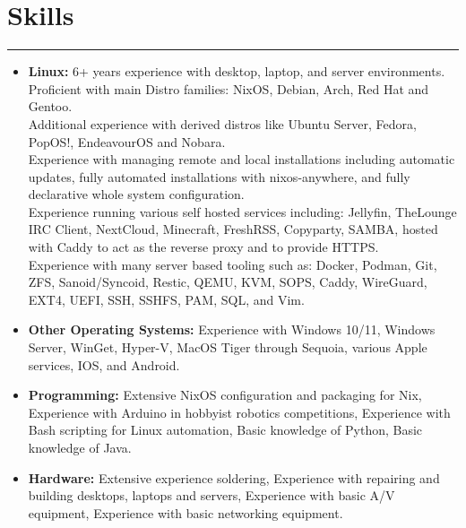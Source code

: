 \documentclass[a4paper,11pt]{article}
\begin{document}
\section*{\hspace*{1em} Skills}
\vspace{-0.2cm}
\hrule
\vspace{0.3cm}
\begin{itemize}
    \item \textbf{Linux:} 6+ years experience with desktop, laptop, and server environments. \\
    Proficient with main Distro families: NixOS, Debian, Arch, Red Hat and Gentoo. \\
    Additional experience with derived distros like Ubuntu Server, Fedora, PopOS!, EndeavourOS and Nobara. \\ 
    Experience with managing remote and local installations including automatic updates, fully automated installations with nixos-anywhere, and fully declarative whole system configuration. \\
    Experience running various self hosted services including: Jellyfin, TheLounge IRC Client, NextCloud, Minecraft, FreshRSS, Copyparty, SAMBA, hosted with Caddy to act as the reverse proxy and to provide HTTPS. \\
    Experience with many server based tooling such as: Docker, Podman, Git, ZFS, Sanoid/Syncoid, Restic, QEMU, KVM, SOPS, Caddy, WireGuard, EXT4, UEFI, SSH, SSHFS, PAM, SQL, and Vim. \\
    \vspace{-0.7cm}
    \item \textbf{Other Operating Systems:} Experience with Windows 10/11, Windows Server, WinGet, Hyper-V, MacOS Tiger through Sequoia, various Apple services, IOS, and Android. \\
    \vspace{-0.7cm}
    \item \textbf{Programming:} Extensive NixOS configuration and packaging for Nix, Experience with Arduino in hobbyist robotics competitions, Experience with Bash scripting for Linux automation, Basic knowledge of Python, Basic knowledge of Java. \\
    \vspace{-0.7cm}
    \item \textbf{Hardware:} Extensive experience soldering, Experience with repairing and building desktops, laptops and servers, Experience with basic A/V equipment, Experience with basic networking equipment. \\
\end{itemize} 
\end{document}
